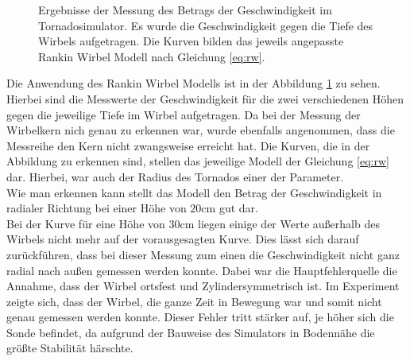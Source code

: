 \documentclass[12pt,a4paper,titlepage,headinclude]{scrartcl}
\numberwithin{equation}{subsection}
\begin{document}
\begin{figure}[!h]
\centering

\caption{Ergebnisse der Messung des Betrags der Geschwindigkeit im Tornadosimulator. Es wurde die Geschwindigkeit gegen die Tiefe des Wirbels aufgetragen. Die Kurven bilden das jeweils angepasste Rankin Wirbel Modell nach Gleichung \eqref{eq:rw}.}
\label{fig:torn1}
\end{figure}
Die Anwendung des Rankin Wirbel Modells ist in der Abbildung \ref{fig:torn1} zu sehen.
Hierbei sind die Messwerte der Geschwindigkeit für die zwei verschiedenen Höhen gegen die jeweilige Tiefe im Wirbel aufgetragen.
Da bei der Messung der Wirbelkern nich genau zu erkennen war, wurde ebenfalls angenommen, dass die Messreihe den Kern nicht zwangsweise erreicht hat.
Die Kurven, die in der Abbildung zu erkennen sind, stellen das jeweilige Modell der Gleichung \eqref{eq:rw} dar.
Hierbei, war auch der Radius des Tornados einer der Parameter.\\
Wie man erkennen kann stellt das Modell den Betrag der Geschwindigkeit in radialer Richtung bei einer Höhe von $20\si{\centi\meter}$ gut dar.\\
Bei der Kurve für eine Höhe von $30\si{\centi\meter}$ liegen einige der Werte außerhalb des Wirbels nicht mehr auf der vorausgesagten Kurve.
Dies lässt sich darauf zurückführen, dass bei dieser Messung zum einen die Geschwindigkeit nicht ganz radial nach außen gemessen werden konnte.
Dabei war die Hauptfehlerquelle die Annahme, dass der Wirbel ortsfest und Zylindersymmetrisch ist.
Im Experiment zeigte sich, dass der Wirbel, die ganze Zeit in Bewegung war und somit nicht genau gemessen werden konnte.
Dieser Fehler tritt stärker auf, je höher sich die Sonde befindet, da aufgrund der Bauweise des Simulators in Bodennähe die größte Stabilität härschte.



\printbibliography[heading=bibintoc]
\end{document}
